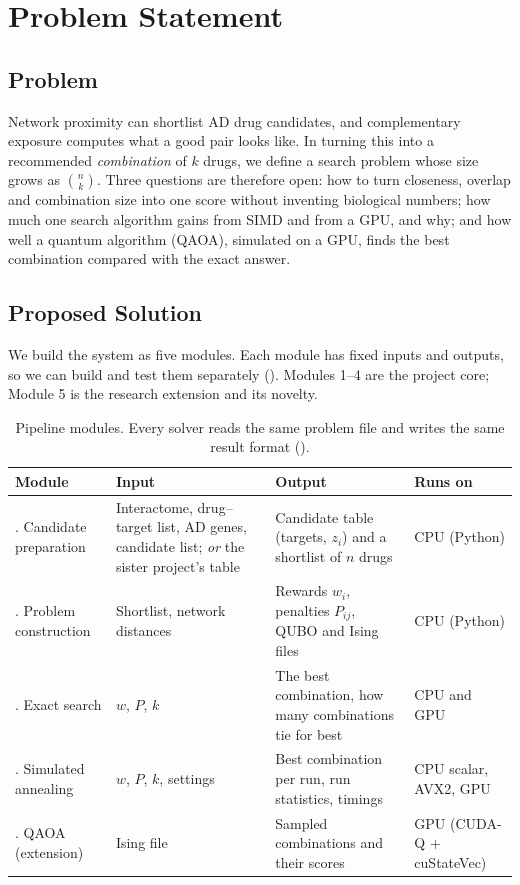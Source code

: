 \section{Problem Statement}
\label{sec:problem}

\subsection{Problem}

Network proximity can shortlist AD drug candidates, and complementary exposure computes what a good pair looks like. In turning this into a recommended \emph{combination} of $k$ drugs, we define a search problem whose size grows as $\binom{n}{k}$. Three questions are therefore open: how to turn closeness, overlap and combination size into one score without inventing biological numbers; how much one search algorithm gains from SIMD and from a GPU, and why; and how well a quantum algorithm (QAOA), simulated on a GPU, finds the best combination compared with the exact answer.

\subsection{Proposed Solution}

We build the system as five modules. Each module has fixed inputs and outputs, so we can build and test them separately (). Modules 1--4 are the project core; Module 5 is the research extension and its novelty.

\begin{table}[H]
\centering
\small
\begin{tabularx}{\linewidth}{>{\raggedright\arraybackslash}p{3.0cm}>{\raggedright\arraybackslash}X>{\raggedright\arraybackslash}X>{\raggedright\arraybackslash}p{2.2cm}}
\toprule
Module & Input & Output & Runs on \\
\midrule
1. Candidate preparation & Interactome, drug--target list, AD genes, candidate list; \emph{or} the sister project's table & Candidate table (targets, $z_i$) and a shortlist of $n$ drugs & CPU (Python) \\
2. Problem construction & Shortlist, network distances & Rewards $w_i$, penalties $P_{ij}$, QUBO and Ising files & CPU (Python) \\
3. Exact search & $w$, $P$, $k$ & The best combination, how many combinations tie for best & CPU and GPU \\
4. Simulated annealing & $w$, $P$, $k$, settings & Best combination per run, run statistics, timings & CPU scalar, AVX2, GPU \\
5. QAOA (extension) & Ising file & Sampled combinations and their scores & GPU (CUDA-Q + cuStateVec) \\
\bottomrule
\end{tabularx}
\caption{Pipeline modules. Every solver reads the same problem file and writes the same result format ().}
\label{tab:modules}
\end{table}

